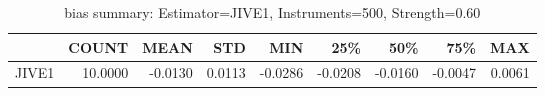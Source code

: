 \begin{table}[ht]
\centering
\caption{bias summary: Estimator=JIVE1, Instruments=500, Strength=0.60}
\begin{tabular}{lrrrrrrrr}
\toprule
 & COUNT & MEAN & STD & MIN & 25\% & 50\% & 75\% & MAX \\
\midrule
JIVE1 & 10.0000 & -0.0130 & 0.0113 & -0.0286 & -0.0208 & -0.0160 & -0.0047 & 0.0061 \\
\bottomrule
\end{tabular}
\end{table}
